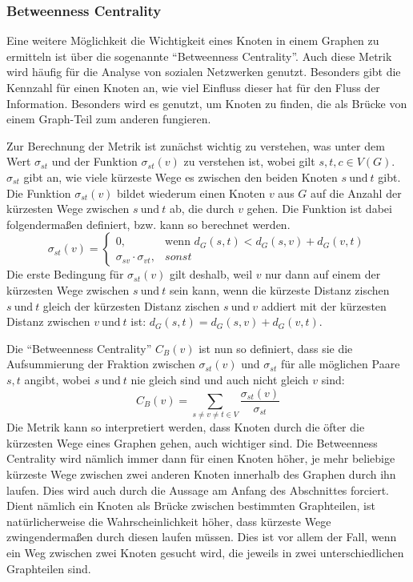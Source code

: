 \documentclass[a4paper,12pt,ngerman,chapterprefix=false,listof=totoc,bibliography=totoc]{scrreprt}
\begin{document}
\subsubsection*{Betweenness Centrality}
{
Eine weitere Möglichkeit die Wichtigkeit eines Knoten in einem Graphen zu ermitteln ist über die sogenannte "`Betweenness Centrality"'. Auch diese Metrik wird häufig für die Analyse von sozialen Netzwerken genutzt. Besonders gibt die Kennzahl für einen Knoten an, wie viel Einfluss dieser hat für den Fluss der Information. Besonders wird es genutzt, um Knoten zu finden, die als Brücke von einem Graph-Teil zum anderen fungieren. \cite{neo4j_betweenness_2020}

Zur Berechnung der Metrik ist zunächst wichtig zu verstehen, was unter dem Wert \(\sigma_{st}\) und der Funktion \(\sigma_{st}(v)\) zu verstehen ist, wobei gilt \(s,t,c \in V(G)\). \(\sigma_{st}\) gibt an, wie viele kürzeste Wege es zwischen den beiden Knoten \(s\ \text{und}\ t\) gibt. Die Funktion \(\sigma_{st}(v)\) bildet wiederum einen Knoten \(v\) aus \(G\) auf die Anzahl der kürzesten Wege zwischen \(s\ \text{und}\ t\) ab, die durch \(v\) gehen. Die Funktion ist dabei folgendermaßen definiert, bzw. kann so berechnet werden. \cite{brandes_faster_2001}
\[
	\sigma_{st}(v)=
	\begin{cases}
		0,	& \text{wenn }d_G(s,t)<d_G(s,v)+d_G(v,t)\\
		\sigma_{sv}\cdot\sigma_{vt},	& sonst
	\end{cases}
\]
Die erste Bedingung für \(\sigma_{st}(v)\) gilt deshalb, weil \(v\) nur dann auf einem der kürzesten Wege zwischen \(s\ \text{und}\ t\) sein kann, wenn die kürzeste Distanz zischen \(s\ \text{und}\ t\) gleich der kürzesten Distanz zischen \(s\ \text{und}\ v\) addiert mit der kürzesten Distanz zwischen \(v\ \text{und}\ t\) ist: \(d_G(s,t)=d_G(s,v)+d_G(v,t)\).

Die "`Betweenness Centrality"' \(C_B(v)\) ist nun so definiert, dass sie die Aufsummierung der Fraktion zwischen \(\sigma_{st}(v)\) und \(\sigma_{st}\) für alle möglichen Paare \(s,t\) angibt, wobei \(s\ \text{und}\ t\) nie gleich sind und auch nicht gleich \(v\) sind:
\[
	C_B(v)=\sum_{s\neq v\neq t\in V}\frac{\sigma_{st}(v)}{\sigma_{st}}
\]
Die Metrik kann so interpretiert werden, dass Knoten durch die öfter die kürzesten Wege eines Graphen gehen, auch wichtiger sind. Die Betweenness Centrality wird nämlich immer dann für einen Knoten höher, je mehr beliebige kürzeste Wege zwischen zwei anderen Knoten innerhalb des Graphen durch ihn laufen. Dies wird auch durch die Aussage am Anfang des Abschnittes forciert. Dient nämlich ein Knoten als Brücke zwischen bestimmten Graphteilen, ist natürlicherweise die Wahrscheinlichkeit höher, dass kürzeste Wege zwingendermaßen durch diesen laufen müssen. Dies ist vor allem der Fall, wenn ein Weg zwischen zwei Knoten gesucht wird, die jeweils in zwei unterschiedlichen Graphteilen sind.

}
\end{document}
